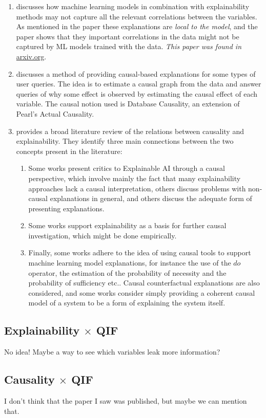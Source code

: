 \begin{enumerate}
\item \cite{Trying to Outrun Causality in Machine Learning: Limitations of Model Explainability Techniques for Identifying Predictive Variables} discusses how machine learning models in combination with explainability methods may not capture all the relevant correlations between the variables. As mentioned in the paper these explanations are \emph{local to the model}, and the paper shows that they important correlations in the data might not be captured by ML models trained with the data. \emph{This paper was found in }\url{arxiv.org}.
\item \cite{XInsight: eXplainable Data Analysis Through The Lens of Causality} discusses a method of providing causal-based explanations for some types of user queries. The idea is to estimate a causal graph from the data and answer queries of why some effect is observed by estimating the causal effect of each variable. The causal notion used is Database Causality, an extension of Pearl's Actual Causality.
\item \cite{The role of causality in explainable artificial intelligence} provides a broad literature review of the relations between causality and explainability. They identify three main connections between the two concepts present in the literature: \begin{enumerate}
    \item Some works present critics to Explainable AI through a causal perspective, which involve mainly the fact that many explainability approaches lack a causal interpretation, others discuss problems with non-causal explanations in general, and others discuss the adequate form of presenting explanations.
    \item Some works support explainability as a basis for further causal investigation, which might be done empirically.
    \item Finally, some works adhere to the idea of using causal tools to support machine learning model explanations, for instance the use of the $do$ operator, the estimation of the probability of necessity and the probability of sufficiency etc.. Causal counterfactual explanations are also considered, and some works consider simply providing a coherent causal model of a system to be a form of explaining the system itself.
    \end{enumerate}
\end{enumerate}

\subsection{Explainability $\times$ QIF}

{\color{red} No idea! Maybe a way to see which variables leak more information?}

\subsection{Causality $\times$ QIF}

{\color{red} I don't think that the paper I saw was published, but maybe we can mention that.}

